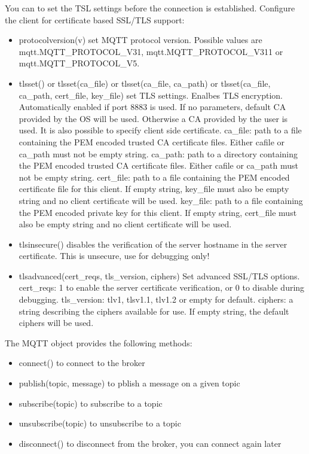 You can to set the TSL settings before the connection is established.
Configure the client for certificate based SSL/TLS support:
\begin{itemize}
\item protocolversion(v) set MQTT protocol version. Possible values are mqtt.MQTT\_PROTOCOL\_V31, mqtt.MQTT\_PROTOCOL\_V311 or mqtt.MQTT\_PROTOCOL\_V5.
\item tlsset() or tlsset(ca\_file) or tlsset(ca\_file, ca\_path) or tlsset(ca\_file, ca\_path, cert\_file, key\_file) set TLS settings.
Enalbes TLS encryption. Automatically enabled if port 8883 is used. If no parameters, default CA provided by the OS will be used.
Otherwise a CA provided by the user is used. It is also possible to specify client side certificate.
ca\_file: path to a file containing the PEM encoded trusted CA certificate files. Either cafile or ca\_path must not be empty string.
ca\_path: path to a directory containing the PEM encoded trusted CA certificate files. Either cafile or ca\_path must not be empty string.
cert\_file: path to a file containing the PEM encoded certificate file for this client. If empty string, key\_file must also be empty string and no client certificate will be used.
key\_file: path to a file containing the PEM encoded private key for this client. If empty string, cert\_file must also be empty string and no client certificate will be used.
\item tlsinsecure() disables the verification of the server hostname in the server certificate. This is unsecure, use for debugging only!
\item tlsadvanced(cert\_reqs, tls\_version, ciphers) Set advanced SSL/TLS options.
cert\_reqs: 1 to enable the server certificate verification, or 0 to disable during debugging.
tls\_version: tlv1, tlsv1.1, tlv1.2 or empty for default.
ciphers: a string describing the ciphers available for use. If empty string, the default ciphers will be used.
\end{itemize}

The MQTT object provides the following methods:
\begin{itemize}
\item connect() to connect to the broker
\item publish(topic, message) to pblish a message on a given topic
\item subscribe(topic) to subscribe to a topic
\item unsubscribe(topic) to unsubscribe to a topic
\item disconnect() to disconnect from the broker, you can connect again later
\end{itemize}

